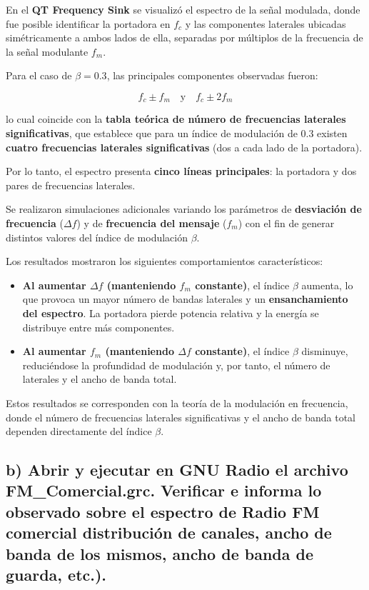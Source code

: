En el \textbf{QT Frequency Sink} se visualizó el espectro de la señal modulada, donde fue posible identificar la portadora en $f_c$ y las componentes laterales ubicadas simétricamente a ambos lados de ella, separadas por múltiplos de la frecuencia de la señal modulante $f_m$.

Para el caso de $\beta = 0.3$, las principales componentes observadas fueron:

\[
f_c \pm f_m \quad \text{y} \quad f_c \pm 2f_m
\]

lo cual coincide con la \textbf{tabla teórica de número de frecuencias laterales significativas}, que establece que para un índice de modulación de 0.3 existen \textbf{cuatro frecuencias laterales significativas} (dos a cada lado de la portadora).

Por lo tanto, el espectro presenta \textbf{cinco líneas principales}: la portadora y dos pares de frecuencias laterales.

Se realizaron simulaciones adicionales variando los parámetros de \textbf{desviación de frecuencia} ($\Delta f$) y de \textbf{frecuencia del mensaje} ($f_m$) con el fin de generar distintos valores del índice de modulación $\beta$.

Los resultados mostraron los siguientes comportamientos característicos:

\begin{itemize}
    \item \textbf{Al aumentar $\Delta f$ (manteniendo $f_m$ constante)}, el índice $\beta$ aumenta, lo que provoca un mayor número de bandas laterales y un \textbf{ensanchamiento del espectro}. La portadora pierde potencia relativa y la energía se distribuye entre más componentes.

    \item \textbf{Al aumentar $f_m$ (manteniendo $\Delta f$ constante)}, el índice $\beta$ disminuye, reduciéndose la profundidad de modulación y, por tanto, el número de laterales y el ancho de banda total.
\end{itemize}

Estos resultados se corresponden con la teoría de la modulación en frecuencia, donde el número de frecuencias laterales significativas y el ancho de banda total dependen directamente del índice $\beta$.


\subsection*{b) Abrir y ejecutar en GNU Radio el archivo FM\_Comercial.grc. Verificar e informa lo observado sobre el espectro de Radio FM comercial distribución de canales, ancho de banda de los mismos, ancho de banda de guarda, etc.).}

